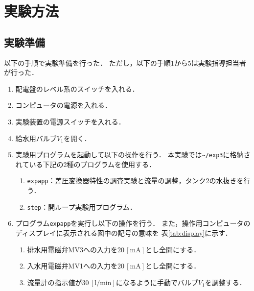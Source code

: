 \documentclass[11pt,a4paper]{jsarticle}
\begin{document}
\section{実験方法}
  \setcounter{equation}{0}
  \setcounter{figure}{0}
  \setcounter{table}{0}
  
  \subsection{実験準備}
    以下の手順で実験準備を行った．
    ただし，以下の手順1から5は実験指導担当者が行った．
    \begin{enumerate}
      \item 配電盤のレベル系のスイッチを入れる．
      \item コンピュータの電源を入れる．
      \item 実験装置の電源スイッチを入れる．
      \item 給水用バルブ$V_1$を開く．
      \item 実験用プログラムを起動して以下の操作を行う．
            本実験では\texttt{\~{}/exp3}に格納されている下記の2種のプログラムを使用する．
        \begin{enumerate}
          \setlength{\leftskip}{5mm}
          \item \texttt{expapp}：差圧変換器特性の調査実験と流量の調整，タンク2の水抜きを行う．
          \item \texttt{step}：開ループ実験用プログラム．
        \end{enumerate}
      \item プログラム\texttt{expapp}を実行し以下の操作を行う．
            また，操作用コンピュータのディスプレイに表示される図中の記号の意味を
            表\ref{tab:display}に示す．
        \begin{enumerate}
          \setlength{\leftskip}{5mm}
          \item 排水用電磁弁MV3への入力を$20 \, \mathrm{[mA]}$とし全開にする．
          \item 入水用電磁弁MV1への入力を$20 \, \mathrm{[mA]}$とし全開にする．
          \item 流量計の指示値が$30 \, \mathrm{[l/min]}$になるように手動でバルブ$V_1$を調整する．
        \end{enumerate}
    \end{enumerate}
    
    
  
\end{document}
